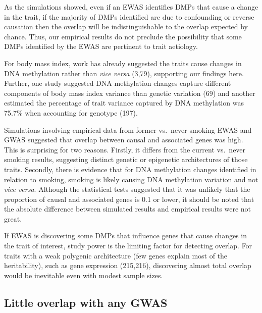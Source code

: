 \documentclass[11pt,twoside]{bristolthesis}
\begin{document}
As the simulations showed, even if an EWAS identifies DMPs that cause a change in the trait, if the majority of DMPs identified are due to confounding or reverse causation then the overlap will be indistinguishable to the overlap expected by chance. Thus, our empirical results do not preclude the possibility that some DMPs identified by the EWAS are pertinent to trait aetiology.

For body mass index, work has already suggested the traits cause changes in DNA methylation rather than \emph{vice versa} (3,79), supporting our findings here. Further, one study suggested DNA methylation changes capture different components of body mass index variance than genetic variation (69) and another estimated the percentage of trait variance captured by DNA methylation was 75.7\% when accounting for genotype (197).

Simulations involving empirical data from former vs.~never smoking EWAS and GWAS suggested that overlap between causal and associated genes was high. This is surprising for two reasons. Firstly, it differs from the current vs.~never smoking results, suggesting distinct genetic or epigenetic architectures of those traits. Secondly, there is evidence that for DNA methylation changes identified in relation to smoking, smoking is likely causing DNA methylation variation and not \emph{vice versa}. Although the statistical tests suggested that it was unlikely that the proportion of causal and associated genes is 0.1 or lower, it should be noted that the absolute difference between simulated results and empirical results were not great.

If EWAS is discovering some DMPs that influence genes that cause changes in the trait of interest, study power is the limiting factor for detecting overlap. For traits with a weak polygenic architecture (few genes explain most of the heritability), such as gene expression (215,216), discovering almost total overlap would be inevitable even with modest sample sizes.

\hypertarget{little-overlap-with-any-gwas}{%
\subsection{Little overlap with any GWAS}\label{little-overlap-with-any-gwas}}
\end{document}

